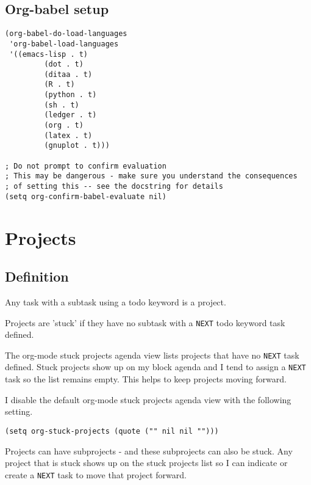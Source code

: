 \documentclass[11pt]{scrartcl}
\begin{document}
\subsection{Org-babel setup}
\label{sec:orgheadline37}

\begin{verbatim}
(org-babel-do-load-languages
 'org-babel-load-languages
 '((emacs-lisp . t)
         (dot . t)
         (ditaa . t)
         (R . t)
         (python . t)
         (sh . t)
         (ledger . t)
         (org . t)
         (latex . t)
         (gnuplot . t)))

; Do not prompt to confirm evaluation
; This may be dangerous - make sure you understand the consequences
; of setting this -- see the docstring for details
(setq org-confirm-babel-evaluate nil)
\end{verbatim}

\section{Projects}
\label{sec:orgheadline41}
\subsection{Definition}
\label{sec:orgheadline39}
Any task with a subtask using a todo keyword is a project.

Projects are 'stuck' if they have no subtask with a \texttt{NEXT} todo
keyword task defined.

The org-mode stuck projects agenda view lists projects that have no
\texttt{NEXT} task defined.  Stuck projects show up on my block agenda and I
tend to assign a \texttt{NEXT} task so the list remains empty.  This helps to
keep projects moving forward.

I disable the default org-mode stuck projects agenda view with the
following setting.
\begin{verbatim}
(setq org-stuck-projects (quote ("" nil nil "")))
\end{verbatim}

Projects can have subprojects - and these subprojects can also be stuck.
Any project that is stuck shows up on the stuck projects list so I can
indicate or create a \texttt{NEXT} task to move that project forward.
\end{document}
